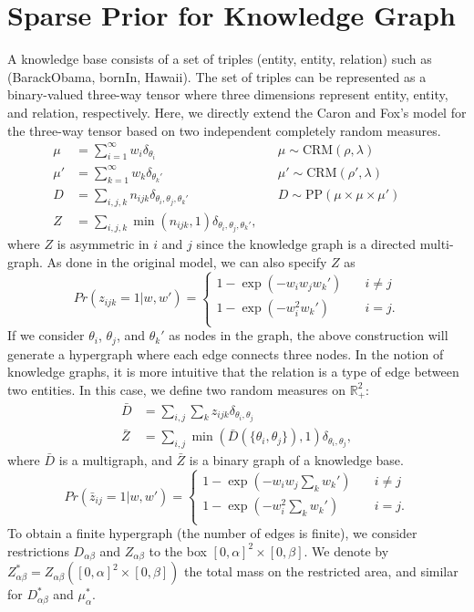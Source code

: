 \documentclass{article}
\begin{document}
\section{Sparse Prior for Knowledge Graph}
A knowledge base consists of a set of triples (entity, entity, relation) such as (BarackObama, bornIn, Hawaii). The set of triples can be represented as a binary-valued three-way tensor where three dimensions represent entity, entity, and relation, respectively. Here, we directly extend the Caron and Fox's model for the three-way tensor based on two independent completely random measures.
\begin{align}
\mu &= \sum_{i=1}^{\infty} w_i \delta_{\theta_i} & &\mu \sim \text{CRM}(\rho, \lambda)\\
\mu' &= \sum_{k=1}^{\infty} w_k \delta_{\theta_k'} & &\mu' \sim \text{CRM}(\rho', \lambda)\\
D &= \sum_{i,j,k} n_{ijk} \delta_{\theta_i, \theta_j, \theta_k'}& &D \sim \text{PP}(\mu \times \mu \times \mu') && \\
Z &=\sum_{i,j,k} \min(n_{ijk}, 1)\delta_{\theta_i, \theta_j, \theta_k'}, &&
\end{align}
where $Z$ is asymmetric in $i$ and $j$ since the knowledge graph is a directed multi-graph. As done in the original model, we can also specify $Z$ as
\[ Pr(z_{ijk}=1|w, w') = 
  \begin{cases}
    1 - \exp(-w_iw_jw_k')       & \quad i \neq j\\
    1 - \exp(-w_i^2w_k') & \quad i = j.\\
  \end{cases}
\]
If we consider $\theta_i$, $\theta_j$, and $\theta_k'$ as nodes in the graph, the above construction will generate a hypergraph where each edge connects three nodes. In the notion of knowledge graphs, it is more intuitive that the relation is a type of edge between two entities. In this case, we define two random measures on $\mathbb{R}_+^2$:
\begin{align}
\bar{D} &= \sum_{i,j}\sum_{k}z_{ijk}\delta_{\theta_i,\theta_j}\\
\bar{Z} &= \sum_{i,j}\min(\bar{D}(\{\theta_i, \theta_j\}), 1) \delta_{\theta_i,\theta_j},
\end{align}
where $\bar{D}$ is a multigraph, and $\bar{Z}$ is a binary graph of a knowledge base.
\[ Pr(\bar{z}_{ij}=1|w, w') = 
  \begin{cases}
    1 - \exp(-w_iw_j\sum_{k}w_k')       & \quad i \neq j\\
    1 - \exp(-w_i^2\sum_{k}w_k') & \quad i = j.\\
  \end{cases}
\]
To obtain a finite hypergraph (the number of edges is finite), we consider restrictions ${D}_{\alpha\beta}$ and ${Z}_{\alpha\beta}$ to the box $[0,\alpha]^2\times[0,\beta]$. We denote by $Z_{\alpha\beta}^* = Z_{\alpha\beta}([0,\alpha]^2\times[0,\beta])$ the total mass on the restricted area, and similar for $D_{\alpha\beta}^*$ and $\mu_{\alpha}^*$.
\end{document}
